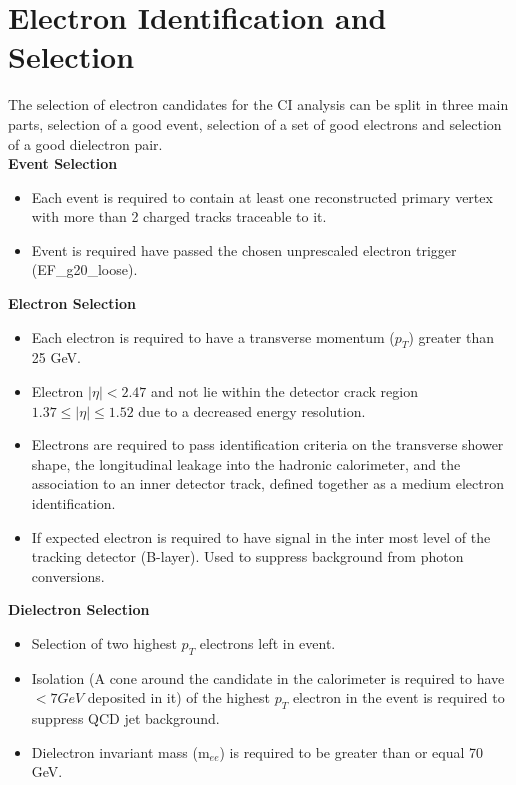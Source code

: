 \section{Electron Identification and Selection}
The selection of electron candidates for the CI analysis can be split in three main parts, selection of a good event, selection of a set of good electrons and selection of a good dielectron pair.\\



{\bf Event Selection}
\begin{itemize}
\item Each event is required to contain at least one reconstructed primary vertex with more than 2 charged tracks traceable to it.
\item Event is required have passed the chosen unprescaled electron trigger (EF\_g20\_loose).
\end{itemize}


{\bf Electron Selection}
\begin{itemize}
\item Each electron is required to have a transverse momentum ($p_{T}$) greater than 25 GeV.
\item Electron $|\eta| < 2.47$ and not lie within the detector crack region $1.37 \leq |\eta| \leq 1.52$ due to a decreased energy resolution.
\item Electrons are required to pass identification criteria on the transverse shower shape, the longitudinal leakage into the hadronic calorimeter, and the association to an inner detector track, defined together as a medium electron identification.
\item If expected electron is required to have signal in the inter most level of the tracking detector (B-layer). Used to suppress background from photon conversions.
\end{itemize}


{\bf Dielectron Selection}
\begin{itemize}
\item Selection of two highest $p_{T}$ electrons left in event.
\item Isolation (A cone around the candidate in the calorimeter is required to have $< 7 GeV$ deposited in it) of the highest $p_{T}$ electron in the event is required to suppress QCD jet background. 
\item Dielectron invariant mass (m$_{ee}$) is required to be greater than or equal 70 GeV.
\end{itemize}

